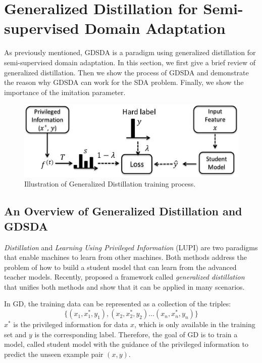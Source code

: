 \section{Generalized Distillation for Semi-supervised Domain Adaptation}\label{sec:aaai:gdda}
As previously mentioned, GDSDA is a paradigm using generalized distillation for semi-supervised domain adaptation. In this section, we first give a brief review of generalized distillation. Then we show the process of GDSDA and demonstrate the reason why GDSDA can work for the SDA problem. Finally, we show the importance of the imitation parameter. 
\begin{figure}\label{fig:gd}
	\centering
	\includegraphics[scale=.6]{aaai/figure/GD.png}
	\caption{Illustration of Generalized Distillation training process.}
\end{figure}
\subsection{An Overview of Generalized Distillation and GDSDA}
\textit{Distillation} \cite{hinton2015distilling} and \textit{Learning Using Privileged Information} (LUPI) \cite{vapnik2015learning} are two paradigms that enable machines to learn from other machines. Both methods address the problem of how to build a student model that can learn from the advanced teacher models. Recently, \cite{lopez2015unifying} proposed a framework called \textit{generalized distillation} that unifies both methods and show that it can be applied in many scenarios.

In GD, the training data can be represented as a collection of the triples:
\[\{\left(x_1,x_1^*,y_1\right),\left(x_2,x_2^*,y_2\right) \dots \left(x_n,x_n^*,y_n\right)\}\]
$x^*$ is the privileged information for data $x$, which is only available in the training set and $y$ is the corresponding label. Therefore, the goal of GD is to train a model, called student model with the guidance of the privileged information to predict the unseen example pair $(x,y)$.


